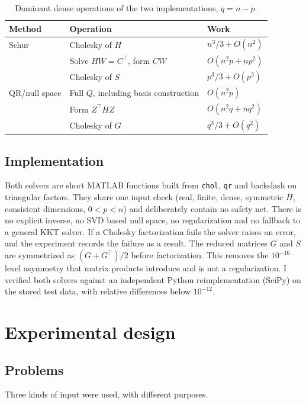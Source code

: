 \documentclass[10pt]{article}
\begin{document}
\begin{table}[t]
\centering\small
\begin{tabular}{@{}lll@{}}
\toprule
Method & Operation & Work\\
\midrule
Schur & Cholesky of $H$ & $n^3/3+O(n^2)$\\
      & Solve $HW=C^\top$, form $CW$ & $O(n^2p+np^2)$\\
      & Cholesky of $S$ & $p^3/3+O(p^2)$\\
\midrule
QR/null space & Full $Q$, including basis construction & $O(n^2p)$\\
      & Form $Z^\top HZ$ & $O(n^2q+nq^2)$\\
      & Cholesky of $G$ & $q^3/3+O(q^2)$\\
\bottomrule
\end{tabular}
\caption{Dominant dense operations of the two implementations, $q=n-p$.}
\label{tab:cost}
\end{table}

\subsection{Implementation}

Both solvers are short MATLAB functions built from \texttt{chol}, \texttt{qr} and
backslash on triangular factors. They share one input check (real, finite, dense,
symmetric $H$, consistent dimensions, $0<p<n$) and deliberately contain no safety net.
There is no explicit inverse, no SVD based null space, no regularization and no
fallback to a general KKT solver. If a Cholesky factorization fails the solver raises an
error, and the experiment records the failure as a result. The reduced matrices $G$ and $S$
are symmetrized as $(G+G^\top)/2$ before factorization. This removes the $10^{-16}$ level
asymmetry that matrix products introduce and is not a regularization. I verified both
solvers against an independent Python reimplementation (SciPy) on the stored test data,
with relative differences below $10^{-12}$.

\section{Experimental design}\label{sec:setup}

\subsection{Problems}

Three kinds of input were used, with different purposes.
\end{document}
